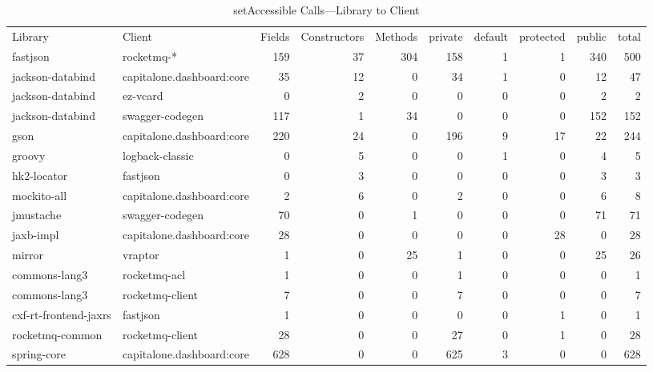 \begin{landscape}
\vspace*{\fill}
\begin{table*}[ht]
\centering
\begingroup \small
\caption{\label{tab:set-accessible-lib-to-client}setAccessible Calls---Library to Client} 
\begin{tabular}{ll!{\color{verylightgray}\vrule}rrr!{\color{verylightgray}\vrule}rrrr!{\color{verylightgray}\vrule}r}
Library & Client & Fields & Constructors & Methods & private & default & protected & public & total \\ 
 \hline
  fastjson              & rocketmq-*                & 159 & 37 & 304 & 158 &1 &  1  & 340 & 500 \\ 
  jackson-databind      & capitalone.dashboard:core & 35 & 12 & 0    & 34  &1 &  0  & 12 & 47 \\ 
  jackson-databind      & ez-vcard                  & 0 & 2 & 0      & 0   &0 &  0  & 2 & 2 \\ 
  jackson-databind      & swagger-codegen           & 117 & 1 & 34   & 0   &0 &  0  & 152 & 152 \\ 
  gson                  & capitalone.dashboard:core & 220 & 24 & 0   & 196 &9 &  17 & 22 & 244 \\ 
  groovy                & logback-classic           & 0 & 5 & 0      & 0   &1 &  0  & 4 & 5 \\ 
  hk2-locator           & fastjson                  & 0 & 3 & 0      & 0   &0 &  0  & 3 & 3 \\ 
  mockito-all           & capitalone.dashboard:core & 2 & 6 & 0      & 2   &0 &  0  & 6 & 8 \\ 
  jmustache             & swagger-codegen           & 70 & 0 & 1     & 0   &0 &  0  & 71 & 71 \\ 
  jaxb-impl             & capitalone.dashboard:core & 28 & 0 & 0     & 0   &0 &  28 & 0 & 28 \\ 
  mirror                & vraptor                   & 1 & 0 & 25     & 1   &0 &  0  & 25 & 26 \\ 
  commons-lang3         & rocketmq-acl              & 1 & 0 & 0      & 1   &0 &  0  & 0 & 1 \\ 
  commons-lang3         & rocketmq-client           & 7 & 0 & 0      & 7   &0 &  0  & 0 & 7 \\ 
  cxf-rt-frontend-jaxrs & fastjson                  & 1 & 0 & 0      & 0   &0 &  1  & 0 & 1 \\ 
  rocketmq-common       & rocketmq-client           & 28 & 0 & 0     & 27  &0 &  1  & 0 & 28 \\ 
  spring-core           & capitalone.dashboard:core & 628 & 0 & 0    & 625 &3 &  0  & 0 & 628 \\ 
\end{tabular}
\endgroup
\end{table*}
\vspace*{\fill}
\end{landscape}
